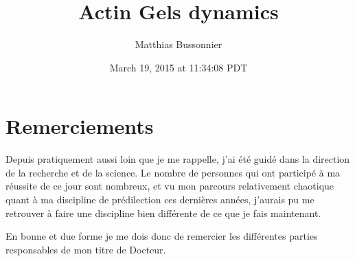 \documentclass[A4paperpaper,11pt,english]{sphinxmanual}
\title{Actin Gels dynamics}
\date{March 19, 2015 at 11:34:08 PDT}
\author{Matthias Bussonnier}
\renewcommand{\maketitle}{}
\begin{document}
\maketitle

\tableofcontents
\cleardoublepage
\pagestyle{normal}
\setlength{\headheight}{14pt}
 
\label{index-latex::doc}



\chapter{Remerciements}
\label{parts/remerciements:remerciements}\label{parts/remerciements::doc}\label{parts/remerciements:contents}
Depuis pratiquement aussi loin que je me rappelle, j'ai été guidé dans la
direction de la recherche et de la science. Le nombre de personnes qui ont
participé à ma réussite de ce jour sont nombreux, et vu mon parcours
relativement chaotique quant à ma discipline de prédilection ces dernières années,
j'aurais pu me retrouver à faire une discipline bien différente de ce que je fais maintenant.

En bonne et due forme je me dois donc de remercier les différentes parties
responsables de mon titre de Docteur.
\end{document}
